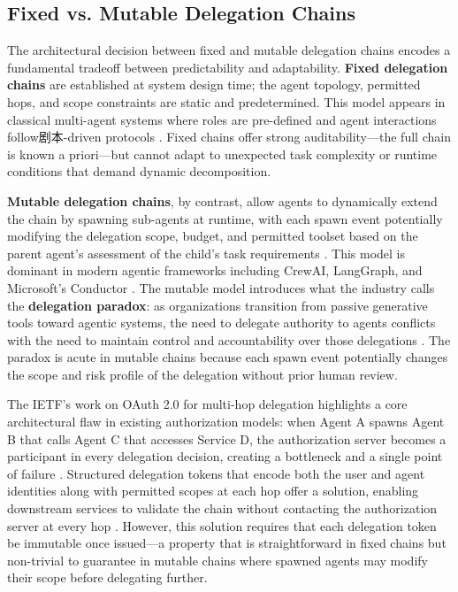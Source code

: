 \subsection{Fixed vs. Mutable Delegation Chains}

The architectural decision between fixed and mutable delegation chains encodes a fundamental tradeoff between predictability and adaptability. \textbf{Fixed delegation chains} are established at system design time; the agent topology, permitted hops, and scope constraints are static and predetermined. This model appears in classical multi-agent systems where roles are pre-defined and agent interactions follow剧本-driven protocols \cite{ferber1999multi}. Fixed chains offer strong auditability---the full chain is known a priori---but cannot adapt to unexpected task complexity or runtime conditions that demand dynamic decomposition.

\textbf{Mutable delegation chains}, by contrast, allow agents to dynamically extend the chain by spawning sub-agents at runtime, with each spawn event potentially modifying the delegation scope, budget, and permitted toolset based on the parent agent's assessment of the child's task requirements \cite{agentspawn2025}. This model is dominant in modern agentic frameworks including CrewAI, LangGraph, and Microsoft's Conductor \cite{dhiwise2025frameworks}. The mutable model introduces what the industry calls the \textbf{delegation paradox}: as organizations transition from passive generative tools toward agentic systems, the need to delegate authority to agents conflicts with the need to maintain control and accountability over those delegations \cite{forbes2026delegation}. The paradox is acute in mutable chains because each spawn event potentially changes the scope and risk profile of the delegation without prior human review.

The IETF's work on OAuth 2.0 for multi-hop delegation highlights a core architectural flaw in existing authorization models: when Agent A spawns Agent B that calls Agent C that accesses Service D, the authorization server becomes a participant in every delegation decision, creating a bottleneck and a single point of failure \cite{workos2025multihop}. Structured delegation tokens that encode both the user and agent identities along with permitted scopes at each hop offer a solution, enabling downstream services to validate the chain without contacting the authorization server at every hop \cite{scalekit2025delegated}. However, this solution requires that each delegation token be immutable once issued---a property that is straightforward in fixed chains but non-trivial to guarantee in mutable chains where spawned agents may modify their scope before delegating further.

